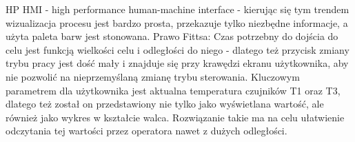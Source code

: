 HP HMI -  high performance human-machine interface - 
kierując się tym trendem wizualizacja procesu jest bardzo prosta, 
przekazuje tylko niezbędne informacje, a użyta paleta barw jest stonowana. 
\newline
Prawo Fittsa: Czas potrzebny do dojścia do celu jest funkcją wielkości celu i odległości do niego - 
dlatego też przycisk zmiany trybu pracy jest dość mały i znajduje się przy krawędzi ekranu użytkownika, 
aby nie pozwolić na nieprzemyślaną zmianę trybu sterowania.
\newline
Kluczowym parametrem dla użytkownika jest aktualna temperatura czujników T1 oraz T3, 
dlatego też został on przedstawiony nie tylko jako wyświetlana wartość, 
ale również jako wykres w kształcie walca. Rozwiązanie takie ma na celu ułatwienie odczytania tej wartości przez operatora nawet z dużych odległości.

\newpage
